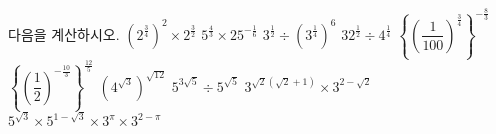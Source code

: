 다음을 계산하시오.
 $(2^{\frac{3}{4}})^{2}\times 2^{\frac{3}{2}}$
 $5^{\frac{4}{3}}\times 25^{-\frac{1}{6}}$
 $3^{\frac{1}{2}}\div(3^{\frac{1}{4}})^{6}$
 $32^{\frac{1}{2}}\div 4^{\frac{1}{4}}$
 $\left\{\left(\dfrac{1}{100}\right)^{\frac{3}{4}}\right\}^{-\frac{8}{3}}$
 $\left\{\left(\dfrac{1}{2}\right)^{-\frac{10}{3}}\right\}^{\frac{12}{5}}$
 $(4^{\sqrt{3}})^{\sqrt{12}}$
 $5^{3\sqrt{5}}\div 5^{\sqrt{5}}$
 $3^{\sqrt{2}(\sqrt{2}+1)}\times 3^{2-\sqrt{2}}$
 $5^{\sqrt{3}}\times 5^{1-\sqrt{3}}\times 3^{\pi}\times 3^{2-\pi}$
